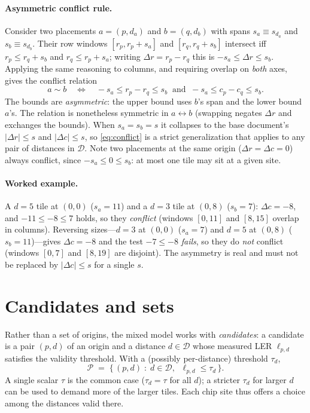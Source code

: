 \documentclass[11pt]{article}
\newcommand{\Pset}{\mathcal{P}}
\newcommand{\Dset}{\mathcal{D}}
\begin{document}
\paragraph{Asymmetric conflict rule.}
Consider two placements $a = (p, d_a)$ and $b = (q, d_b)$ with spans $s_a \equiv
s_{d_a}$ and $s_b \equiv s_{d_b}$. Their row windows $[r_p, r_p + s_a]$ and
$[r_q, r_q + s_b]$ intersect iff $r_p \le r_q + s_b$ and $r_q \le r_p + s_a$;
writing $\Delta r = r_p - r_q$ this is $-s_a \le \Delta r \le s_b$. Applying the
same reasoning to columns, and requiring overlap on \emph{both} axes, gives the
conflict relation
\begin{equation}
  a \sim b
  \quad\Longleftrightarrow\quad
  -s_a \le r_p - r_q \le s_b
  \;\;\text{and}\;\;
  -s_a \le c_p - c_q \le s_b .
  \label{eq:conflict}
\end{equation}
The bounds are \emph{asymmetric}: the upper bound uses $b$'s span and the lower
bound $a$'s. The relation is nonetheless symmetric in $a \leftrightarrow b$
(swapping negates $\Delta r$ and exchanges the bounds). When $s_a = s_b = s$ it
collapses to the base document's $|\Delta r| \le s$ and $|\Delta c| \le s$, so
\eqref{eq:conflict} is a strict generalization that applies to any pair of
distances in $\Dset$. Note two placements at the same origin
($\Delta r = \Delta c = 0$) always conflict, since $-s_a \le 0 \le s_b$: at most
one tile may sit at a given site.

\paragraph{Worked example.}
A $d=5$ tile at $(0,0)$ ($s_a = 11$) and a $d=3$ tile at $(0,8)$ ($s_b = 7$):
$\Delta c = -8$, and $-11 \le -8 \le 7$ holds, so they \emph{conflict} (windows
$[0,11]$ and $[8,15]$ overlap in columns). Reversing sizes---$d=3$ at $(0,0)$
($s_a=7$) and $d=5$ at $(0,8)$ ($s_b=11$)---gives $\Delta c = -8$ and the test
$-7 \le -8$ \emph{fails}, so they do \emph{not} conflict (windows $[0,7]$ and
$[8,19]$ are disjoint). The asymmetry is real and must not be replaced by
$|\Delta c| \le s$ for a single $s$.

\section{Candidates and sets}

Rather than a set of origins, the mixed model works with \emph{candidates}: a
candidate is a pair $(p, d)$ of an origin and a distance $d \in \Dset$ whose
measured LER $\ell_{p,d}$ satisfies the validity threshold. With a (possibly
per-distance) threshold $\tau_d$,
\[
  \Pset \;=\; \bigl\{\, (p, d) \;:\; d \in \Dset,\;\;
  \ell_{p,d} \le \tau_d \,\bigr\}.
\]
A single scalar $\tau$ is the common case ($\tau_d = \tau$ for all $d$); a stricter
$\tau_d$ for larger $d$ can be used to demand more of the larger tiles. Each chip
site thus offers a choice among the distances valid there.
\end{document}
